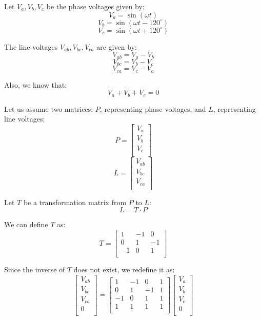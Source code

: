 Let \( V_a, V_b, V_c \) be the phase voltages given by:
\[
    V_a = \sin(\omega t)
\]
\[
    V_b = \sin(\omega t - 120^\circ)
\]
\[
    V_c = \sin(\omega t + 120^\circ)
\]

The line voltages \( V_{ab}, V_{bc}, V_{ca} \) are given by:
\[
    V_{ab} = V_a - V_b
\]
\[
    V_{bc} = V_b - V_c
\]
\[
    V_{ca} = V_c - V_a
\]

Also, we know that:
\[
    V_a + V_b + V_c = 0
\]

Let us assume two matrices: \( P \), representing phase voltages, and \( L \),
representing line voltages:
\[
    P = \begin{bmatrix}
        V_a \\
        V_b \\
        V_c \\
    \end{bmatrix}
\]
\[
    L = \begin{bmatrix}
        V_{ab} \\
        V_{bc} \\
        V_{ca} \\
    \end{bmatrix}
\]

Let \( T \) be a transformation matrix from \( P \) to \( L \):
\[
    L = T \cdot P
\]

We can define \( T \) as:
\[
    T = \begin{bmatrix}
        1  & -1 & 0  \\
        0  & 1  & -1 \\
        -1 & 0  & 1  \\
    \end{bmatrix}
\]

Since the inverse of \( T \) does not exist, we redefine it as:
\[
    \begin{bmatrix}
        V_{ab} \\
        V_{bc} \\
        V_{ca} \\
        0      \\
    \end{bmatrix} = \begin{bmatrix}
        1  & -1 & 0  & 1 \\
        0  & 1  & -1 & 1 \\
        -1 & 0  & 1  & 1 \\
        1  & 1  & 1  & 1 \\
    \end{bmatrix} \begin{bmatrix}
        V_a \\
        V_b \\
        V_c \\
        0   \\
    \end{bmatrix}
\]

